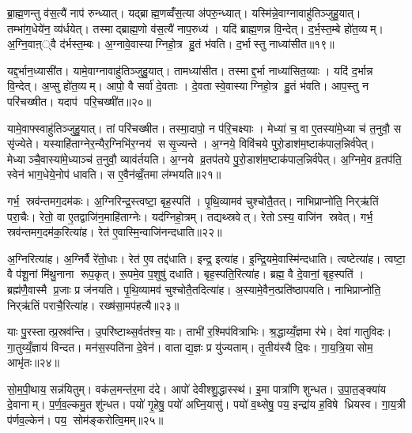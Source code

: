 ब्रा॒ह्म॒णन्तु व॑स॒त्यै॑ नाप॑ रुन्ध्यात्। यद्ब्राह्म॒णव्वँ॑स॒त्या अ॑परु॒न्ध्यात्। यस्मि॑न्ने॒वाग्नावाहु॑तिञ्जुहु॒यात्। तम्भा॑ग॒धेये॑न॒ व्य॑र्धयेत्। तस्माद्ब्राह्म॒णो व॑स॒त्यै॑ नाप॒रुध्य॑। यदि॑ ब्राह्म॒णन्न वि॒न्देत्। द॒र्भ॒स्त॒म्बे हो॑त॒व्यम्। अ॒ग्नि॒वाऩ््वै द॑र्भस्त॒म्बः। अ॒ग्नावे॒वास्याग्निहो॒त्र हु॒तं भ॑वति। द॒र्भास्तु नाध्या॑सीत॥१९॥

यद्द॒र्भान॒ध्यासी॑त। यामे॒वाग्नावाहु॑तिञ्जुहु॒यात्। तामध्या॑सीत। तस्माद्द॒र्भा नाध्या॑सित॒व्याः। यदि॑ द॒र्भान्न वि॒न्देत्। अ॒प्सु हो॑त॒व्यम्। आपो॒ वै सर्वा॑ दे॒वताः। दे॒वतास्वे॒वास्याग्निहो॒त्र हु॒तं भ॑वति। आप॒स्तु न परि॑चख्षीत। यदाप॑ परि॒चख्षी॑त॥२०॥

यामे॒वाफ्स्वाहु॑तिञ्जुहु॒यात्। तां परि॑चख्षीत। तस्मा॒दापो॒ न प॑रि॒चक्ष्याः। मेध्या॑ च॒ वा ए॒तस्या॑मे॒ध्या च॑ त॒नुवौ॒ स सृ॑ज्येते। यस्याहि॑ताग्नेर॒न्यैर॒ग्निभि॑र॒ग्नय॑ ससृ॒ज्यन्ते। अ॒ग्नये॒ विवि॑चये पुरो॒डाश॑म॒ष्टाक॑पाल॒न्निर्व॑पेत्। मेध्याञ्चै॒वास्या॑मे॒ध्याञ्च॑ त॒नुवौ॒ व्याव॑र्तयति। अ॒ग्नये व्र॒तप॑तये पु॒रो॒डाश॑म॒ष्टाक॑पाल॒न्निर्व॑पेत्। अ॒ग्निमे॒व व्र॒तप॑ति॒ स्वेन॑ भाग॒धेये॒नोप॑ धावति। स ए॒वैन॑व्व्रँ॒तमा ल॑म्भयति॥२१॥

गर्भ॒ स्रव॑न्तमग॒दम॑कः। अ॒ग्निरिन्द्र॒स्त्वष्टा॒ बृह॒स्पति॑। पृ॒थि॒व्यामव॑ चुश्चोतै॒तत्। नाभिप्राप्नो॑ति॒ निर्‌ऋ॑तिं परा॒चैः। रेतो॒ वा ए॒तद्वाजि॑न॒माहि॑ताग्नेः। यद॑ग्निहो॒त्रम्। तद्यथ्स्रवेत्। रेतोऽस्य॒ वाजि॑न स्रवेत्। गर्भ॒ स्रव॑न्तमग॒दम॑क॒रित्या॑ह। रेत॑ ए॒वास्मि॒न्वाजि॑नन्दधाति॥२२॥

अ॒ग्निरित्या॑ह। अ॒ग्निर्वै रे॑तो॒धाः। रेत॑ ए॒व तद्द॑धाति। इन्द्र॒ इत्या॑ह। इ॒न्द्रि॒यमे॒वास्मि॑न्दधाति। त्वष्टेत्या॑ह। त्वष्टा॒ वै प॑शू॒नां मि॑थु॒नाना रूप॒कृत्। रू॒पमे॒व प॒शुषु॑ दधाति। बृह॒स्पति॒रित्या॑ह। ब्रह्म॒ वै दे॒वानां॒ बृह॒स्पति॑। ब्रह्म॑णै॒वास्मै प्र॒जाः प्र ज॑नयति। पृ॒थि॒व्यामव॑ चुश्चोतै॒तदित्या॑ह। अ॒स्यामे॒वैन॒त्प्रति॑ष्ठापयति। नाभिप्राप्नो॑ति॒ निर्‌ऋ॑तिं पराचै॒रित्या॑ह। रख्ष॑सा॒मप॑हत्यै॥२३॥

याः पु॒रस्तात्प्र॒स्रव॑न्ति। उ॒परि॑ष्टाथ्स॒र्वत॑श्च॒ याः। ताभी॑ र॒श्मिप॑वित्राभिः। श्र॒द्धाय्यँ॒ज्ञमा र॑भे। देवा॑ गातुविदः। गा॒तुय्यँ॒ज्ञाय॑ विन्दत। मन॑स॒स्पति॑ना दे॒वेन॑। वाताद्य॒ज्ञः प्र यु॑ज्यताम्। तृ॒तीय॑स्यै दि॒वः। गा॒य॒त्रि॒या सोम॒ आभृ॑तः॥२४॥

सो॒म॒पी॒थाय॒ सन्न॑यितुम्। वक॑ल॒मन्त॑र॒मा द॑दे। आपो॑ देवीश्शु॒द्धास्स्थ॑। इ॒मा पात्रा॑णि शुन्धत। उ॒पा॒त॒ङ्क्या॑य दे॒वानाम्। प॒र्ण॒व॒ल्कमु॒त शु॑न्धत। पयो॑ गृ॒हेषु॒ पयो॑ अघ्नि॒यासु॑। पयो॑ व॒थ्सेषु॒ पय॒ इन्द्रा॑य ह॒विषे ध्रियस्व। गा॒य॒त्री प॑र्णव॒ल्केन॑। पय॒ सोम॑ङ्करोत्वि॒मम्॥२५॥

